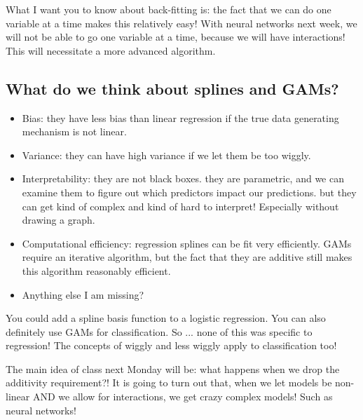 What I want you to know about back-fitting is: the fact that we can do one variable at a time makes this relatively easy! With neural networks next week, we will not be able to go one variable at a time, because we will have interactions! This will necessitate a more advanced algorithm. 


\subsection{What do we think about splines and GAMs?}
\begin{itemize}
\item Bias: they have less bias than linear regression if the true data generating mechanism is not linear. 
\item Variance: they can have high variance if we let them be too wiggly. 
\item Interpretability: they are not black boxes. they are parametric, and we can examine them to figure out which predictors impact our predictions. but they can get kind of complex and kind of hard to interpret! Especially without drawing a graph. 
\item Computational efficiency: regression splines can be fit very efficiently. GAMs require an iterative algorithm, but the fact that they are additive still makes this algorithm reasonably efficient. 
\item Anything else I am missing? 	
\end{itemize}

You could add a spline basis function to a logistic regression. You can also definitely use GAMs for classification. So ... none of this was specific to regression! The concepts of wiggly and less wiggly apply to classification too!

The main idea of class next Monday will be: what happens when we drop the additivity requirement?! It is going to turn out that, when we let models be non-linear AND we allow for interactions, we get crazy complex models! Such as neural networks!







